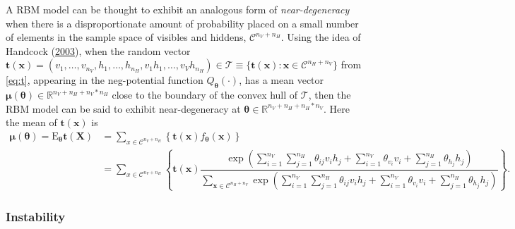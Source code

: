 \documentclass[]{article}
\theoremstyle{definition}
\newcommand{\nv}{{n_{\scriptscriptstyle V}}}
\newcommand{\nh}{{n_{\scriptscriptstyle H}}}
\begin{document}
A RBM model can be thought to exhibit an analogous form of
\emph{near-degeneracy} when there is a disproportionate amount of
probability placed on a small number of elements in the sample space of
visibles and hiddens, \(\mathcal{C}^{\nv + \nh}\). Using the idea of
Handcock (\protect\hyperlink{ref-handcock2003assessing}{2003}), when the
random vector
\(\boldsymbol t(\boldsymbol x) = (v_1, \dots, v_\nv, h_1, \dots, h_\nh, v_1 h_1, \dots, v_V h_\nh ) \in \mathcal{T} \equiv \{\boldsymbol t(\boldsymbol x): \boldsymbol x \in \mathcal{C}^{\nh + \nv} \}\)
from \eqref{eq:t}, appearing in the neg-potential function
\(Q_{\boldsymbol \theta}(\cdot)\), has a mean vector
\(\boldsymbol \mu(\boldsymbol \theta) \in \mathbb{R}^{\nv + \nh + \nv * \nh}\)
close to the boundary of the convex hull of \(\mathcal{T}\), then the
RBM model can be said to exhibit near-degeneracy at
\(\boldsymbol \theta \in \mathbb{R}^{\nv + \nh + \nh*\nv}\). Here the
mean of \(\boldsymbol t(\boldsymbol x)\) is \begin{align*}
\boldsymbol \mu(\boldsymbol \theta) = \text{E}_{\boldsymbol \theta} \boldsymbol t(\boldsymbol X)  &= \sum\limits_{x \in \mathcal{C}^{\nv + \nh}} \left\{ \boldsymbol t(\boldsymbol x) f_{\boldsymbol \theta} (\boldsymbol x) \right\} \\
&= \sum\limits_{x \in \mathcal{C}^{\nv + \nh}} \left\{ \boldsymbol t(\boldsymbol x)\dfrac{\exp\left(\sum\limits_{i = 1}^\nv \sum\limits_{j=1}^\nh \theta_{ij} v_i h_j + \sum\limits_{i = 1}^\nv\theta_{v_i} v_i + \sum\limits_{j = 1}^\nh\theta_{h_j} h_j\right)}{\sum\limits_{\boldsymbol x \in \mathcal{C}^{\nh + \nv}}\exp\left(\sum\limits_{i = 1}^\nv \sum\limits_{j=1}^\nh \theta_{ij} v_i h_j + \sum\limits_{i = 1}^\nv\theta_{v_i} v_i + \sum\limits_{j = 1}^\nh\theta_{h_j} h_j\right)}\right\}.
\end{align*}
\hypertarget{instability}{%
\subsubsection{Instability}\label{instability}}
\end{document}
